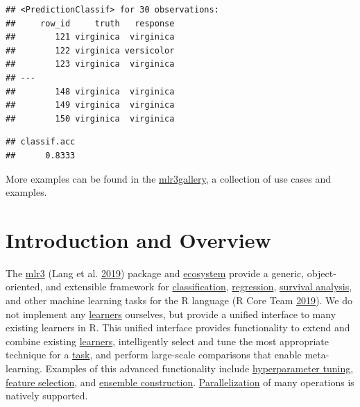 \documentclass[]{scrbook}
\newenvironment{Shaded}{\begin{snugshade}}{\end{snugshade}}
\newcommand{\CommentTok}[1]{\textcolor[rgb]{0.56,0.35,0.01}{\textit{#1}}}
\newcommand{\KeywordTok}[1]{\textcolor[rgb]{0.13,0.29,0.53}{\textbf{#1}}}
\newcommand{\NormalTok}[1]{#1}
\newcommand{\OperatorTok}[1]{\textcolor[rgb]{0.81,0.36,0.00}{\textbf{#1}}}
\newcommand{\StringTok}[1]{\textcolor[rgb]{0.31,0.60,0.02}{#1}}
\renewenvironment{Shaded} {\begin{snugshade}\small} {\end{snugshade}}
\begin{document}
\begin{verbatim}
## <PredictionClassif> for 30 observations:
##     row_id     truth   response
##        121 virginica  virginica
##        122 virginica versicolor
##        123 virginica  virginica
## ---                            
##        148 virginica  virginica
##        149 virginica  virginica
##        150 virginica  virginica
\end{verbatim}

\begin{Shaded}
\end{Shaded}

\begin{verbatim}
## classif.acc 
##      0.8333
\end{verbatim}

More examples can be found in the \href{https://mlr3gallery.mlr-org.com}{mlr3gallery}, a collection of use cases and examples.

\hypertarget{introduction}{%
\chapter{Introduction and Overview}\label{introduction}}

The \href{https://mlr3.mlr-org.com}{mlr3} (Lang et al. \protect\hyperlink{ref-mlr3}{2019}) package and \href{https://github.com/mlr-org/mlr3/wiki/Extension-Packages}{ecosystem} provide a generic, object-oriented, and extensible framework for \protect\hyperlink{tasks}{classification}, \protect\hyperlink{tasks}{regression}, \protect\hyperlink{survival}{survival analysis}, and other machine learning tasks for the R language (R Core Team \protect\hyperlink{ref-R}{2019}).
We do not implement any \protect\hyperlink{learners}{learners} ourselves, but provide a unified interface to many existing learners in R.
This unified interface provides functionality to extend and combine existing \protect\hyperlink{learners}{learners}, intelligently select and tune the most appropriate technique for a \protect\hyperlink{tasks}{task}, and perform large-scale comparisons that enable meta-learning.
Examples of this advanced functionality include \protect\hyperlink{tuning}{hyperparameter tuning}, \protect\hyperlink{fs}{feature selection}, and \protect\hyperlink{fs-ensemble}{ensemble construction}. \protect\hyperlink{parallelization}{Parallelization} of many operations is natively supported.
\end{document}
